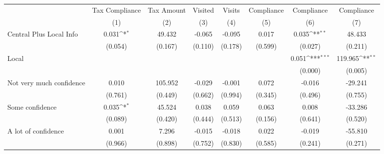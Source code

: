 {
\def\sym#1{\ifmmode^{#1}\else\(^{#1}\)\fi}
\begin{tabular}{l*{7}{c}}
\toprule
                &\multicolumn{1}{c}{Tax Compliance}&\multicolumn{1}{c}{Tax Amount}&\multicolumn{1}{c}{Visited}&\multicolumn{1}{c}{Visits}&\multicolumn{1}{c}{Compliance}&\multicolumn{1}{c}{Compliance}&\multicolumn{1}{c}{Compliance}\\
                &\multicolumn{1}{c}{(1)}         &\multicolumn{1}{c}{(2)}         &\multicolumn{1}{c}{(3)}         &\multicolumn{1}{c}{(4)}         &\multicolumn{1}{c}{(5)}         &\multicolumn{1}{c}{(6)}         &\multicolumn{1}{c}{(7)}         \\
\midrule
Central Plus Local Info&    0.031\sym{*}  &   49.432         &   -0.065         &   -0.095         &    0.017         &    0.035\sym{**} &   48.433         \\
                &  (0.054)         &  (0.167)         &  (0.110)         &  (0.178)         &  (0.599)         &  (0.027)         &  (0.211)         \\
Local           &                  &                  &                  &                  &                  &    0.051\sym{***}&  119.965\sym{**} \\
                &                  &                  &                  &                  &                  &  (0.000)         &  (0.005)         \\
Not very much confidence&    0.010         &  105.952         &   -0.029         &   -0.001         &    0.072         &   -0.016         &  -29.241         \\
                &  (0.761)         &  (0.449)         &  (0.662)         &  (0.994)         &  (0.345)         &  (0.496)         &  (0.755)         \\
Some confidence &    0.035\sym{*}  &   45.524         &    0.038         &    0.059         &    0.063         &    0.008         &  -33.286         \\
                &  (0.089)         &  (0.420)         &  (0.444)         &  (0.513)         &  (0.156)         &  (0.641)         &  (0.520)         \\
A lot of confidence&    0.001         &    7.296         &   -0.015         &   -0.018         &    0.022         &   -0.019         &  -55.810         \\
                &  (0.966)         &  (0.898)         &  (0.752)         &  (0.830)         &  (0.585)         &  (0.241)         &  (0.271)         \\

\end{tabular}}
